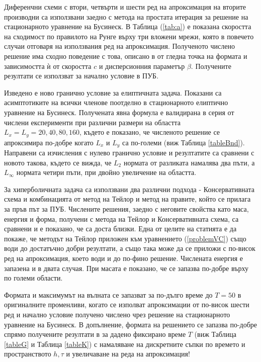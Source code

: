 \documentclass[a5paper]{article}
\newcommand{\rf}[1]{(\ref{#1})}
\theoremstyle{remark}
\begin{document}
\begin{normalsize}
Диференчни схеми с втори, четвърти и шести ред на апроксимация на вторите производни са използвани заедно с метода на простата итерация за решение на стационарното уравнение на Бусинеск. В Таблица \rf{tab:a} е показана скоростта на сходимост по правилото на Рунге върху три вложени мрежи, която в повечето случаи отговаря на използвания ред на апроксимация. Полученото числено решение има сходно поведение с това, описано в \cite{ref117,ref116} от гледна точка на формата и зависимостта ѝ от скоростта $c$ и дисперсионния параметър $\beta$. Получените резултати се използват за начално условие в ПУБ.

Изведено е ново гранично условие за елиптичната задача. Показани са асимптотиките на всички членове поотделно в стационарното елиптично уравнение на Бусинеск. Получената явна формула е валидирана в серия от числени експерименти при различни размери на областта $L_x=L_y=20,40,80,160$, където е показано, че численото решение се апроксимира по-добре когато $L_x$ и $L_y$ са по-големи (виж Таблица \ref{tableBnd}). Направени са изчисления с нулево гранично условие и резултатите са сравнени с новото такова, където се вижда, че $L_2$ нормата от разликата намалява два пъти, а $L_\infty$ нормата четири пъти, при двойно увеличение на областта.

За хиперболичната задача са използвани два различни подхода - Консервативната схема и комбинацията от метод на Тейлор и метод на правите, който се прилага за пръв път за ПУБ. Числените решения, заедно с неговите свойства като маса, енергия и форма, получени с метода на Тейлор и Консервативната схема, са сравнени и е показано, че са доста близки. Една от целите на статията е да покаже, че методът на Тейлор приложен към уравнението \rf{problemVC} също води до достатъчно добри резултати, а също така може да се приложи с по-висок ред на апроксимация, което води и до по-фино решение. Числената енергия е запазена и в двата случая. При масата е показано, че се запазва по-добре върху по големи области. 

Формата и максимумът на вълната се запазват за по-дълго време до $T=50$ в оригиналните променливи, когато се изполват апроксимации от по-висок шести ред и начално условие получено числено чрез решение на стационарното уравнение на Бусинеск. В допълнение, формата на решението се запазва по-добре спрямо получените резултати в \cite{ref21, ref20, ref23, ref22, ref25} за дадено фиксирано време $T$ (виж Таблица \ref{tableG} и Таблица \ref{tableK}) с намаляване на дискретните съпки по времето и пространството $h, \tau$ и увеличаване на реда на апроксимация!


\end{normalsize}
\end{document}
